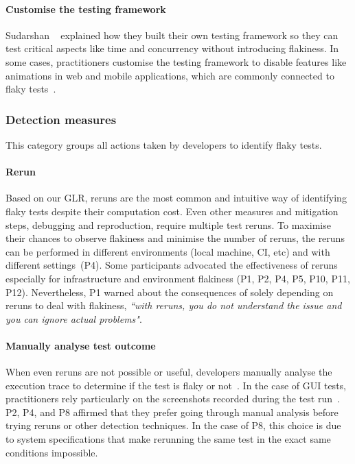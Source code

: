 \paragraph{\textbf{Customise the testing framework}}
Sudarshan \etal~\cite{Nomorefl8:online} explained how they built their own testing framework so they can test critical aspects like time and concurrency without introducing flakiness. 
In some cases, practitioners customise the testing framework to disable features like animations in web and mobile applications, which are commonly connected to flaky tests~\cite{TestStab71:online}. 




\subsubsection{Detection measures}
This category groups all actions taken by developers to identify flaky tests.



\paragraph{\textbf{Rerun}}
Based on our GLR, reruns are the most common and intuitive way of identifying flaky tests despite their computation cost.
Even other measures and mitigation steps, \eg debugging and reproduction, require multiple test reruns.
To maximise their chances to observe flakiness and minimise the number of reruns, the reruns can be performed in different environments (local machine, CI, etc) and with different settings~(P4).
Some participants advocated the effectiveness of reruns especially for infrastructure and environment flakiness (P1, P2, P4, P5, P10, P11, P12).
Nevertheless, P1 warned about the consequences of solely depending on reruns to deal with flakiness, \textit{``with reruns, you do not understand the issue and you can ignore actual problems"}.

\paragraph{\textbf{Manually analyse test outcome}}
When even reruns are not possible or useful, developers manually analyse the execution trace to determine if the test is flaky or not~\cite{Preventi83:online}.
In the case of GUI tests, practitioners rely particularly on the screenshots recorded during the test run~\cite{Flakytes0:online,FlakyTes55:online,Selenium34:online}.
P2, P4, and P8 affirmed that they prefer going through manual analysis before trying reruns or other detection techniques.
In the case of P8, this choice is due to system specifications that make rerunning the same test in the exact same conditions impossible. 

